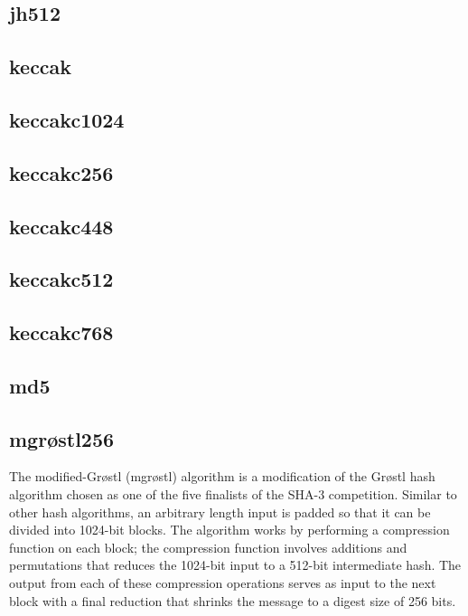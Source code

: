 \documentclass[10pt,a4paper]{article}
\begin{document}
\subsection{jh512}
\subsection{keccak}
\subsection{keccakc1024}
\subsection{keccakc256}
\subsection{keccakc448}
\subsection{keccakc512}
\subsection{keccakc768}
\subsection{md5}


\subsection{mgr{\o}stl256}
The modified-Gr{\o}stl (mgr{\o}stl) algorithm is a modification of the Gr{\o}stl hash algorithm chosen as one of the five finalists of the SHA-3 competition.  Similar to other hash algorithms, an arbitrary length input is padded so that it can be divided into 1024-bit blocks.  The algorithm works by performing a compression function on each block; the compression function involves additions and permutations that reduces the 1024-bit input to a 512-bit intermediate hash.  The output from each of these compression operations serves as input to the next block with a final reduction that shrinks the message to a digest size of 256 bits. 
\end{document}
